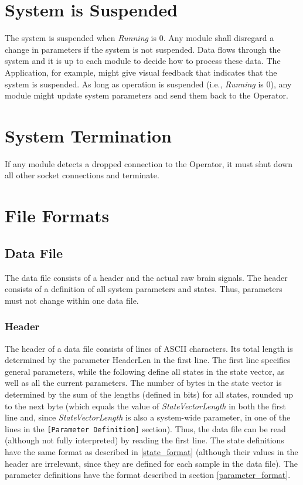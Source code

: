 \documentclass[letterpaper,oneside,12pt]{book}
\begin{document}
\section{System is Suspended}
\label{sec:system_suspended}

The system is suspended when \textit{Running} is 0. Any module shall disregard a 
change in parameters if the system is not suspended. Data flows through the 
system and it is up to each module to decide how to process these data. The 
Application, for example, might give visual feedback that indicates that the 
system is suspended. As long as operation is suspended (i.e., \textit{Running} 
is 0), any module might update system parameters and send them back to the 
Operator.


\section{System Termination}
\label{system_termination}

If any module detects a dropped connection to the Operator, it must shut down 
all other socket connections and terminate.

\section{File Formats}

\subsection{Data File}

The data file consists of a header and the actual raw brain signals. The header 
consists of a definition of all system parameters and states. Thus, parameters 
must not change within one data file.

\subsubsection{Header}

The header of a data file consists of lines of ASCII characters. Its total 
length is determined by the parameter HeaderLen in the first line.
The first line specifies general parameters, while the following define all
states in the state vector, as well as all the current parameters.
The number of bytes in the state vector is determined by the sum of the
lengths (defined in bits) for all states, rounded up to the next byte
(which equals the value of \textit{StateVectorLength} in both the first 
line and, since \textit{StateVectorLength} is also a system-wide parameter,
in one of the lines in the \texttt{[Parameter Definition]} section).
Thus, the data file can be read (although not fully interpreted) by reading
the first line.
The state definitions have the same format as described in \ref{state_format}
(although their values in the header are irrelevant, since they are defined
for each sample in the data file).
The parameter definitions have the format described in section
\ref{parameter_format}.
\end{document}
